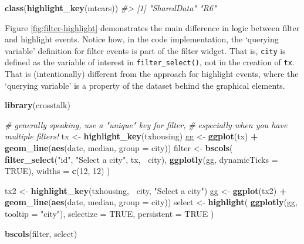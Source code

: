 \documentclass[
  12pt,
]{krantz}
\newenvironment{Shaded}{\begin{snugshade}}{\end{snugshade}}
\newcommand{\CommentTok}[1]{\textcolor[rgb]{0.56,0.35,0.01}{\textit{#1}}}
\newcommand{\DataTypeTok}[1]{\textcolor[rgb]{0.13,0.29,0.53}{#1}}
\newcommand{\DecValTok}[1]{\textcolor[rgb]{0.00,0.00,0.81}{#1}}
\newcommand{\KeywordTok}[1]{\textcolor[rgb]{0.13,0.29,0.53}{\textbf{#1}}}
\newcommand{\NormalTok}[1]{#1}
\newcommand{\OperatorTok}[1]{\textcolor[rgb]{0.81,0.36,0.00}{\textbf{#1}}}
\newcommand{\OtherTok}[1]{\textcolor[rgb]{0.56,0.35,0.01}{#1}}
\newcommand{\StringTok}[1]{\textcolor[rgb]{0.31,0.60,0.02}{#1}}
\begin{document}
\begin{Shaded}
\begin{Highlighting}[]
\KeywordTok{class}\NormalTok{(}\KeywordTok{highlight_key}\NormalTok{(mtcars))}
\CommentTok{#> [1] "SharedData" "R6"}
\end{Highlighting}
\end{Shaded}

Figure \ref{fig:filter-highlight} demonstrates the main difference in logic between filter and highlight events. Notice how, in the code implementation, the `querying variable' definition for filter events is part of the filter widget. That is, \texttt{city} is defined as the variable of interest in \texttt{filter\_select()}, not in the creation of \texttt{tx}. That is (intentionally) different from the approach for highlight events, where the `querying variable' is a property of the dataset behind the graphical elements.

\begin{Shaded}
\begin{Highlighting}[]
\KeywordTok{library}\NormalTok{(crosstalk)}

\CommentTok{# generally speaking, use a "unique" key for filter, }
\CommentTok{# especially when you have multiple filters!}
\NormalTok{tx <-}\StringTok{ }\KeywordTok{highlight_key}\NormalTok{(txhousing)}
\NormalTok{gg <-}\StringTok{ }\KeywordTok{ggplot}\NormalTok{(tx) }\OperatorTok{+}\StringTok{ }\KeywordTok{geom_line}\NormalTok{(}\KeywordTok{aes}\NormalTok{(date, median, }\DataTypeTok{group =}\NormalTok{ city))}
\NormalTok{filter <-}\StringTok{ }\KeywordTok{bscols}\NormalTok{(}
  \KeywordTok{filter_select}\NormalTok{(}\StringTok{"id"}\NormalTok{, }\StringTok{"Select a city"}\NormalTok{, tx, }\OperatorTok{~}\NormalTok{city),}
  \KeywordTok{ggplotly}\NormalTok{(gg, }\DataTypeTok{dynamicTicks =} \OtherTok{TRUE}\NormalTok{),}
  \DataTypeTok{widths =} \KeywordTok{c}\NormalTok{(}\DecValTok{12}\NormalTok{, }\DecValTok{12}\NormalTok{)}
\NormalTok{)}

\NormalTok{tx2 <-}\StringTok{ }\KeywordTok{highlight_key}\NormalTok{(txhousing, }\OperatorTok{~}\NormalTok{city, }\StringTok{"Select a city"}\NormalTok{)}
\NormalTok{gg <-}\StringTok{ }\KeywordTok{ggplot}\NormalTok{(tx2) }\OperatorTok{+}\StringTok{ }\KeywordTok{geom_line}\NormalTok{(}\KeywordTok{aes}\NormalTok{(date, median, }\DataTypeTok{group =}\NormalTok{ city))}
\NormalTok{select <-}\StringTok{ }\KeywordTok{highlight}\NormalTok{(}
  \KeywordTok{ggplotly}\NormalTok{(gg, }\DataTypeTok{tooltip =} \StringTok{"city"}\NormalTok{), }
  \DataTypeTok{selectize =} \OtherTok{TRUE}\NormalTok{, }\DataTypeTok{persistent =} \OtherTok{TRUE}
\NormalTok{)}

\KeywordTok{bscols}\NormalTok{(filter, select)}
\end{Highlighting}
\end{Shaded}
\end{document}
